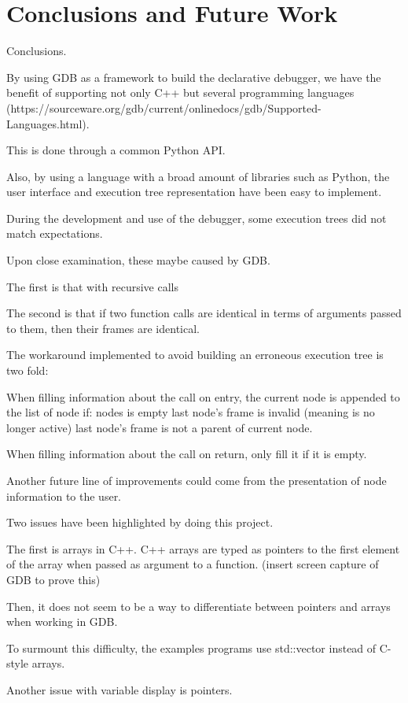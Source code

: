 \chapter{Conclusions and Future Work}
\label{cap:conclusions}

Conclusions.

By using GDB as a framework to build the declarative debugger, we have the benefit of supporting not only C++ but several programming languages (https://sourceware.org/gdb/current/onlinedocs/gdb/Supported-Languages.html).

This is done through a common Python API.

Also, by using a language with a broad amount of libraries such as Python, the user interface and execution tree representation have been easy to implement.

During the development and use of the debugger, some execution trees did not match expectations.

Upon close examination, these maybe caused by GDB.

The first is that with recursive calls

The second is that if two function calls are identical in terms of arguments passed to them, then their frames are identical.

The workaround implemented to avoid building an erroneous execution tree is two fold:

When filling information about the call on entry, the current node is appended to the list of node if:
nodes is empty
last node's frame is invalid (meaning is no longer active)
last node's frame is not a parent of current node.

When filling information about the call on return, only fill it if it is empty.

Another future line of improvements could come from the presentation of node information to the user.

Two issues have been highlighted by doing this project.

The first is arrays in C++. C++ arrays are typed as pointers to the first element of the array when passed as argument to a function. (insert screen capture of GDB to prove this)

Then, it does not seem to be a way to differentiate between pointers and arrays when working in GDB.

To surmount this difficulty, the examples programs use std::vector instead of C-style arrays.

Another issue with variable display is pointers.

